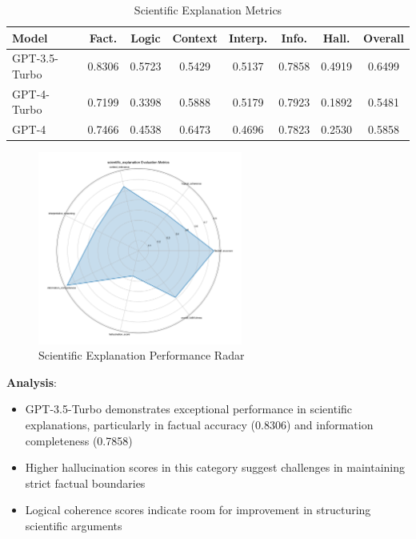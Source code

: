 \begin{table}[!htbp]
\centering
\setlength{\tabcolsep}{4pt}  %
\caption{Scientific Explanation Metrics}
\label{tab:results_scientific_metrics}
\begin{tabular}{|l|c|c|c|c|c|c|c|}
\hline
\textbf{Model} & \textbf{Fact.} & \textbf{Logic} & \textbf{Context} & \textbf{Interp.} 
& \textbf{Info.} & \textbf{Hall.} & \textbf{Overall} \\
\hline
GPT-3.5-Turbo & 0.8306 & 0.5723 & 0.5429 & 0.5137 & 0.7858 & 0.4919 & 0.6499 \\
GPT-4-Turbo & 0.7199 & 0.3398 & 0.5888 & 0.5179 & 0.7923 & 0.1892 & 0.5481 \\
GPT-4 & 0.7466 & 0.4538 & 0.6473 & 0.4696 & 0.7823 & 0.2530 & 0.5858 \\
\hline
\end{tabular}
\end{table}

\begin{figure}[!htbp]
\centering
\includegraphics[width=0.6\textwidth]{figures/types/scientific_explanation_radar_gpt-4.png}
\caption{Scientific Explanation Performance Radar}
\label{fig:scientific_radar}
\end{figure}

\textbf{Analysis}:
\begin{itemize}
    \item GPT-3.5-Turbo demonstrates exceptional performance in scientific explanations, particularly in factual accuracy (0.8306) and information completeness (0.7858)
    \item Higher hallucination scores in this category suggest challenges in maintaining strict factual boundaries
    \item Logical coherence scores indicate room for improvement in structuring scientific arguments
\end{itemize}

